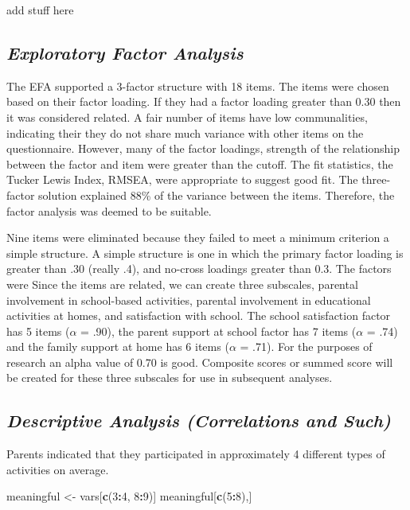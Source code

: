 \documentclass[
  12pt,
]{article}
\newenvironment{Shaded}{\begin{snugshade}}{\end{snugshade}}
\newcommand{\DecValTok}[1]{\textcolor[rgb]{0.00,0.00,0.81}{#1}}
\newcommand{\KeywordTok}[1]{\textcolor[rgb]{0.13,0.29,0.53}{\textbf{#1}}}
\newcommand{\NormalTok}[1]{#1}
\newcommand{\OperatorTok}[1]{\textcolor[rgb]{0.81,0.36,0.00}{\textbf{#1}}}
\newcommand{\StringTok}[1]{\textcolor[rgb]{0.31,0.60,0.02}{#1}}
\begin{document}
add stuff here

\hypertarget{exploratory-factor-analysis}{%
\subsection{\texorpdfstring{\textbf{\emph{Exploratory Factor
Analysis}}}{Exploratory Factor Analysis}}\label{exploratory-factor-analysis}}

The EFA supported a 3-factor structure with 18 items. The items were
chosen based on their factor loading. If they had a factor loading
greater than 0.30 then it was considered related. A fair number of items
have low communalities, indicating their they do not share much variance
with other items on the questionnaire. However, many of the factor
loadings, strength of the relationship between the factor and item were
greater than the cutoff. The fit statistics, the Tucker Lewis Index,
RMSEA, were appropriate to suggest good fit. The three-factor solution
explained 88\% of the variance between the items. Therefore, the factor
analysis was deemed to be suitable.

Nine items were eliminated because they failed to meet a minimum
criterion a simple structure. A simple structure is one in which the
primary factor loading is greater than .30 (really .4), and no-cross
loadings greater than 0.3. The factors were Since the items are related,
we can create three subscales, parental involvement in school-based
activities, parental involvement in educational activities at homes, and
satisfaction with school. The school satisfaction factor has 5 items
(\(\alpha\) = .90), the parent support at school factor has 7 items
(\(\alpha\) = .74) and the family support at home has 6 items
(\(\alpha\) = .71). For the purposes of research an alpha value of 0.70
is good. Composite scores or summed score will be created for these
three subscales for use in subsequent analyses.

\hypertarget{descriptive-analysis-correlations-and-such}{%
\subsection{\texorpdfstring{\textbf{\emph{Descriptive Analysis
(Correlations and
Such)}}}{Descriptive Analysis (Correlations and Such)}}\label{descriptive-analysis-correlations-and-such}}

Parents indicated that they participated in approximately 4 different
types of activities on average.

\begin{Shaded}
\begin{Highlighting}[]
\NormalTok{meaningful <-}\StringTok{ }\NormalTok{vars[}\KeywordTok{c}\NormalTok{(}\DecValTok{3}\OperatorTok{:}\DecValTok{4}\NormalTok{, }\DecValTok{8}\OperatorTok{:}\DecValTok{9}\NormalTok{)]}
\NormalTok{meaningful[}\KeywordTok{c}\NormalTok{(}\DecValTok{5}\OperatorTok{:}\DecValTok{8}\NormalTok{),]}
\end{Highlighting}
\end{Shaded}
\end{document}
